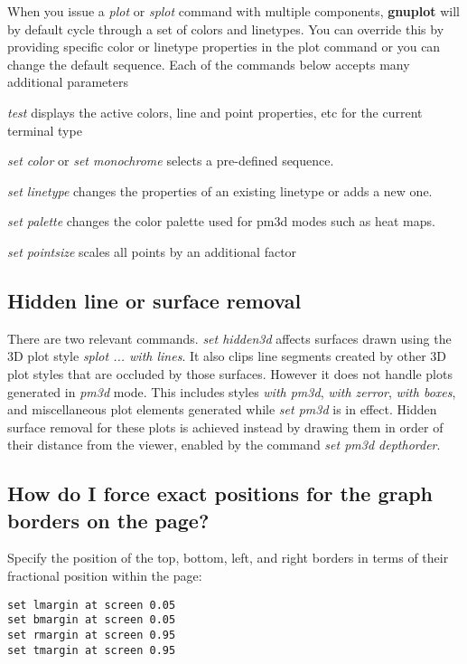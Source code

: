 \documentclass[letter,11pt]{article}
\newcommand{\gnuplot}{\textbf{gnuplot }}
\begin{document}
{When you issue a {\em plot} or {\em splot} command with multiple components,
\gnuplot will by default cycle through a set of colors and linetypes.
You can override this by providing specific color or linetype properties in the
plot command or you can change the default sequence.
Each of the commands below accepts many additional parameters
\begin{list}{}{}
  \item
  {\em test} displays the active colors, line and point properties, etc
             for the current terminal type
  \item
  {\em set color} or {\em set monochrome} selects a pre-defined sequence.
  \item
  {\em set linetype} changes the properties of an existing linetype or adds a new one.
  \item
  {\em set palette} changes the color palette used for pm3d modes such as heat maps.
  \item
  {\em set pointsize} scales all points by an additional factor
\end{list}

\subsection{Hidden line or surface removal}

There are two relevant commands. {\em set hidden3d} affects surfaces
drawn using the 3D plot style {\em splot ... with lines}. It also clips
line segments created by other 3D plot styles that are occluded by those
surfaces.   However it does not handle plots generated in {\em pm3d} mode.
This includes styles {\em with pm3d}, {\em with zerror}, {\em with boxes},
and miscellaneous plot elements generated while {\em set pm3d} is in effect.
Hidden surface removal for these plots is achieved instead by drawing them
in order of their distance from the viewer, enabled by the command
{\em set pm3d depthorder}.

\subsection{How do I force exact positions for the graph borders on the page?}

Specify the position of the top, bottom, left, and right borders in
terms of their fractional position within the page:

\small
\begin{verbatim}
set lmargin at screen 0.05
set bmargin at screen 0.05
set rmargin at screen 0.95
set tmargin at screen 0.95
\end{verbatim}
\normalsize

}
\end{document}
